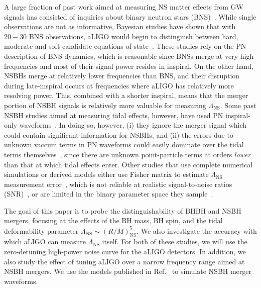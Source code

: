 \documentclass[aps,prd,amsmath,floats,floatfix, twocolumn,
superscriptaddress,nofootinbib,showpacs]{revtex4-1}
\newcommand{\prayush}{\textcolor{red!40!black}}
\newcommand{\lambdans}{\Lambda_\mathrm{NS}}
\newcommand{\NS}{\mathrm{NS}}
\begin{document}
A large fraction of past work aimed at measuring NS matter effects from GW
signals has consisted of inquiries about binary neutron stars (BNS)~\cite{
Lee1999a,Lee1999b,Lee2000,oechslin:07,Read:2008iy,Markakis:2010mp,Markakis:2011vd,
stergioulas:11,East:2011xa,Lackey2014,Wade:2014vqa,Bauswein:2014qla}. While single 
observations are not as informative, Bayesian studies have shown that with
$20-30$ BNS observations, aLIGO would begin to distinguish between hard,
moderate and soft candidate equations of state~\cite{DelPozzo:13,
Chatziioannou:2015uea,Agathos:2015a}. These studies rely on the PN 
description of BNS dynamics, which is reasonable since BNSs merge at very high
frequencies and most of their signal power resides in inspiral.
% 
On the other hand, NSBHs merge at relatively lower frequencies than BNS, 
and their disruption during late-inspiral occurs at frequencies where aLIGO
has relatively more resolving power. This, combined with a shorter inspiral,
means that the merger portion of NSBH signals is relatively more valuable for
measuring $\lambdans$. Some past NSBH studies aimed at measuring tidal effects,
however, have used PN inspiral-only waveforms~\cite{Maselli:2013rza}. In doing
so, however, (i) they ignore the merger signal which could contain significant
information for NSBHs, and (ii) the errors due to unknown vaccum terms in PN 
waveforms could easily dominate over the tidal terms 
themselves~\cite{Yagi:2014}, since there are unknown point-particle terms at 
orders {\it lower} than that at which tidal effects enter. Other studies that
use complete numerical simulations or derived models either use Fisher matrix 
to estimate $\lambdans$ measurement error~\cite{Lackey2011,Lackey:2013axa},
which is not reliable at realistic signal-to-noise ratios 
(SNR)~\cite{Vallisneri:2007ev}, or are limited in the binary parameter space
they sample~\cite{Foucart:2013psa}.




The goal of this paper is to probe the distinguishability of BHBH and NSBH
mergers, focusing at the effects of the BH mass, BH spin, and the tidal 
deformability parameter $\Lambda_\NS\sim(R/M)^5_\NS$. We also investigate the
accuracy with which aLIGO can measure $\Lambda_\NS$ itself. For both of 
these studies, we will use the zero-detuning high-power noise curve for the
aLIGO detectors. \prayush{In addition, we also study the effect of tuning aLIGO
over a narrow frequency range aimed at NSBH mergers.}
We use the models published in Ref.~\cite{Lackey:2013axa,Pannarale:2015jka} to
simulate NSBH merger waveforms.
\end{document}
